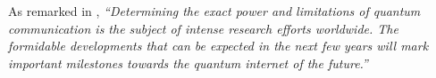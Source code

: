 As remarked in \cite{bib:diamanti2016practical}, \textit{``Determining the exact power and limitations of quantum communication is the subject of intense research efforts worldwide. The formidable developments that can be expected in the next few years will mark important milestones towards the quantum internet of the future.''}